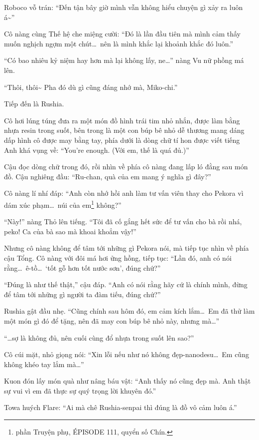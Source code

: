 \documentclass[../main.tex]{subfiles}
\begin{document}
Roboco vỗ trán: ``Đến tận bây giờ mình vẫn không hiểu chuyện gì xảy ra luôn á\~{}''

Cô nàng cùng Thế hệ che miệng cười: ``Đó là lần đầu tiên mà mình cảm thấy muốn nghịch ngợm một chút\dots\ nên là mình khắc lại khoảnh khắc đó luôn.''

``Có bao nhiêu kỷ niệm hay hơn mà lại không lấy, ne\dots'' nàng Vu nữ phồng má lên.

``Thôi, thôi\~{} Pha đó dù gì cũng đáng nhớ mà, Miko-chi.''

Tiếp đến là Rushia.

Cô hơi lúng túng đưa ra một món đồ hình trái tim nhỏ nhắn, được làm bằng nhựa resin trong suốt, bên trong là một con búp bê nhỏ dễ thương mang dáng dấp hình cô được may bằng tay, phía dưới là dòng chữ tí hon được viết tiếng Anh khá vụng về: ``You're enough. (Với em, thế là quá đủ.)''

Cậu đọc dòng chữ trong đó, rồi nhìn về phía cô nàng đang lấp ló đằng sau món đồ. Cậu nghiêng đầu: ``Ru-chan, quà của em mang ý nghĩa gì đây?''

Cô nàng lí nhí đáp: ``Anh còn nhớ hồi anh làm tư vấn viên thay cho Pekora vì dám xúc phạm\dots\ núi của em\footnote{phần {\abv Truyện phụ}, {\flaregothic ÉPISODE 111}, quyển số Chín.} không?''

``Này!'' nàng Thỏ lên tiếng. ``Tôi đã cố gắng hết sức để tư vấn cho bà rồi nhá, peko! Ca của bà sao mà khoai khoẳm vậy!''

Nhưng cô nàng không để tâm tới những gì Pekora nói, mà tiếp tục nhìn về phía cậu Tổng. Cô nàng với đôi má hơi ửng hồng, tiếp tục: ``Lần đó, anh có nói rằng\dots\ ê-tồ\dots\ `tốt gỗ hơn tốt nước sơn', đúng chứ?''

``Đúng là như thế thật,'' cậu đáp. ``Anh có nói rằng hãy cứ là chính mình, đừng để tâm tới những gì người ta đàm tiếu, đúng chứ?''

Rushia gật đầu nhẹ. ``Cũng chính sau hôm đó, em cảm kích lắm\dots\ Em đã thử làm một món gì đó để tặng, nên đã may con búp bê nhỏ này, nhưng mà\dots''

``\dots sợ là không đủ, nên cuối cùng đổ nhựa trong suốt lên sao?''

Cô cúi mặt, nhỏ giọng nói: ``Xin lỗi nếu như nó không đẹp-nanodesu\dots\ Em cũng không khéo tay lắm mà\dots''

Kuon đón lấy món quà như nâng báu vật: ``Anh thấy nó cũng đẹp mà. Anh thật sự vui vì em đã thực sự quý trọng lời khuyên đó.''

Towa huých Flare: ``Ai mà chê Rushia-senpai thì đúng là đồ vô cảm luôn á.''
\end{document}
